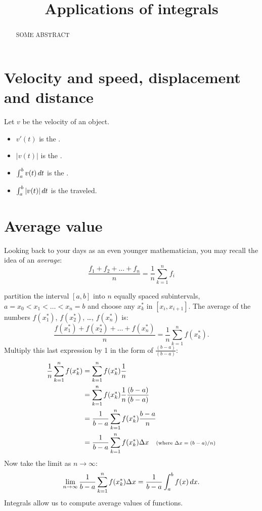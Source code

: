 \documentclass{ximera}
\title[Dig-In:]{Applications of integrals}
\begin{document}
\begin{abstract}
SOME ABSTRACT
\end{abstract}
\maketitle



\section{Velocity and speed, displacement and distance}

\begin{definition}
  Let $v$ be the velocity of an object.
  \begin{itemize}
  \item $v'(t)$ is the .
  \item $|v(t)|$ is the .
  \item $\int_a^b v(t) \,d t$ is the .
  \item $\int_a^b |v(t)| \,d t$ is the  traveled.
  \end{itemize}
\end{definition}


\section{Average value}

Looking back to your days as an even younger mathematician, you may
recall the idea of an \textit{average}:
\[
\frac{f_1+f_2+\dots+f_n}{n} = \frac{1}{n}\sum_{k=1}^n f_i
\]

partition the interval $[a,b]$ into $n$ equally spaced subintervals,
$a=x_0 < x_1 < \dots < x_{n}=b$ and choose any $x_k^*$ in
$[x_i,x_{i+1}]$. The average of the numbers $f(x_1^*)$, $f(x_2^*)$,
\dots, $f(x_n^*)$ is:
\[
\frac{f(x_1^*) + f(x_2^*) + \dots + f(x_n^*)}{n} = \frac1n\sum_{k=1}^n f(x_k^*).
\]
Multiply this last expression by 1 in the form of $\frac{(b-a)}{(b-a)}$:
\begin{align*}
  \frac1n\sum_{k=1}^n f(x_k^*) &= \sum_{k=1}^n f(x_k^*)\frac1n \\
  &= \sum_{k=1}^n f(x_k^*)\frac1n \frac{(b-a)}{(b-a)} \\
  &= \frac{1}{b-a} \sum_{k=1}^n f(x_k^*)\frac{b-a}n  \\
  &=\frac{1}{b-a} \sum_{k=1}^n f(x_k^*)\Delta x\quad \text{\scriptsize (where $\Delta x = (b-a)/n$)}
\end{align*}
Now take the limit as $n\to\infty$:
\[
\lim_{n\to\infty} \frac{1}{b-a} \sum_{k=1}^n f(x_k^*)\Delta x = \frac{1}{b-a} \int_a^b f(x)\,d x.
\]
Integrals allow us to compute average values of functions.
\end{document}
